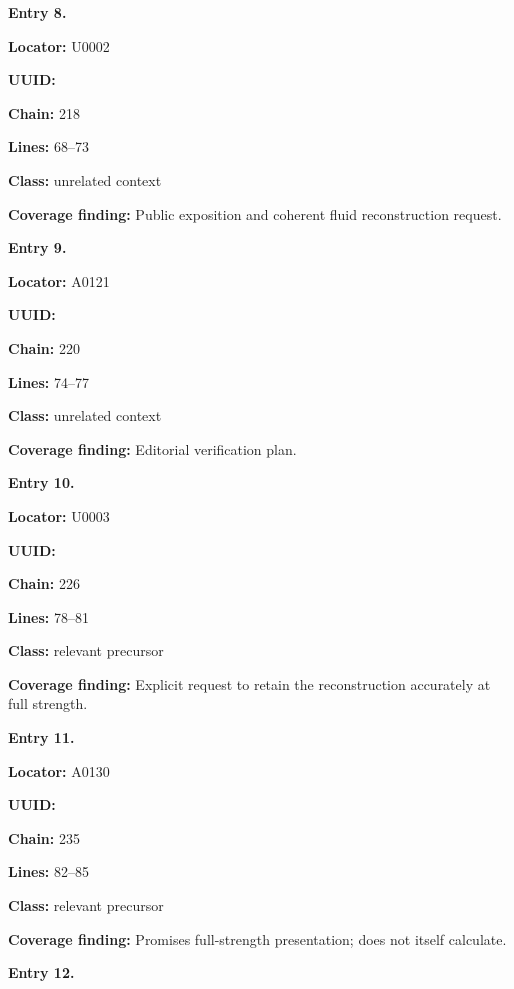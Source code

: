 
\textbf{Entry 8.}

\textbf{Locator:} U0002

\textbf{UUID:} \protect{}

\textbf{Chain:} 218

\textbf{Lines:} 68--73

\textbf{Class:} unrelated context

\textbf{Coverage finding:} Public exposition and coherent fluid
reconstruction request.


\textbf{Entry 9.}

\textbf{Locator:} A0121

\textbf{UUID:} \protect{}

\textbf{Chain:} 220

\textbf{Lines:} 74--77

\textbf{Class:} unrelated context

\textbf{Coverage finding:} Editorial verification plan.


\textbf{Entry 10.}

\textbf{Locator:} U0003

\textbf{UUID:} \protect{}

\textbf{Chain:} 226

\textbf{Lines:} 78--81

\textbf{Class:} relevant precursor

\textbf{Coverage finding:} Explicit request to retain the reconstruction
accurately at full strength.


\textbf{Entry 11.}

\textbf{Locator:} A0130

\textbf{UUID:} \protect{}

\textbf{Chain:} 235

\textbf{Lines:} 82--85

\textbf{Class:} relevant precursor

\textbf{Coverage finding:} Promises full-strength presentation; does not
itself calculate.


\textbf{Entry 12.}

